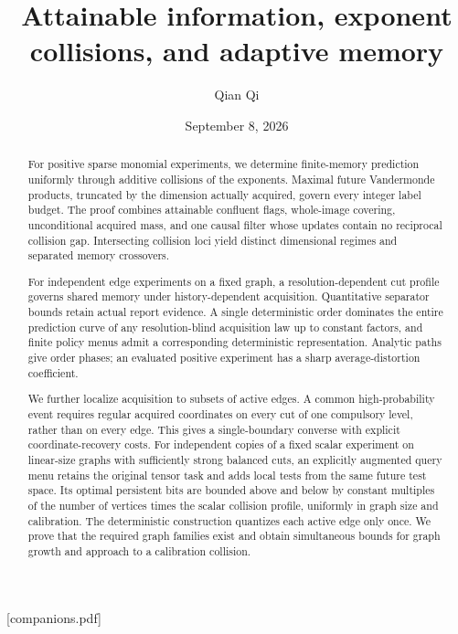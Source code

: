 
[companions.pdf]
\title[Attainable information and adaptive memory]{Attainable information, exponent collisions, and adaptive memory}
\author{Qian Qi}
\date{September 8, 2026}

\begin{abstract}
For positive sparse monomial experiments, we determine finite-memory
prediction uniformly through additive collisions of the exponents.
Maximal future Vandermonde products, truncated by the dimension
actually acquired, govern every integer label budget. The proof combines
attainable confluent flags, whole-image covering, unconditional acquired
mass, and one causal filter whose updates contain no reciprocal
collision gap. Intersecting collision loci yield distinct dimensional
regimes and separated memory crossovers.

For independent edge experiments on a fixed graph, a resolution-dependent
cut profile governs shared memory under history-dependent acquisition.
Quantitative separator bounds retain actual report evidence. A single
deterministic order dominates the entire prediction curve of any
resolution-blind acquisition law up to constant factors, and finite
policy menus admit a corresponding deterministic representation.
Analytic paths give order phases; an evaluated positive experiment
has a sharp average-distortion coefficient.

We further localize acquisition to subsets of active edges. A common
high-probability event requires regular acquired coordinates on every
cut of one compulsory level, rather than on every edge. This gives a
single-boundary converse with explicit coordinate-recovery costs. For
independent copies of a fixed scalar experiment on linear-size graphs
with sufficiently strong balanced cuts, an explicitly augmented query
menu retains the original tensor task and adds local tests from the
same future test space. Its optimal persistent bits are bounded above
and below by constant multiples of the number of vertices times the
scalar collision profile, uniformly in graph size and calibration.
The deterministic construction quantizes each active edge only once.
We prove that the required graph families exist and obtain simultaneous
bounds for graph growth and approach to a calibration collision.
\end{abstract}
\maketitle










